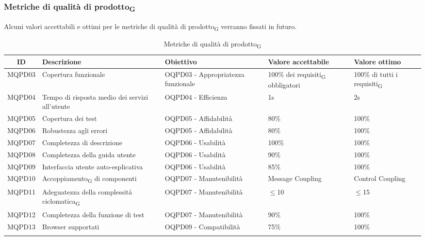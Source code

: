 \newpage
\subsubsection{Metriche di qualità di prodotto\textsubscript{G}}
Alcuni valori accettabili e ottimi per le metriche di qualità di prodotto\textsubscript{G} verranno fissati in futuro.
\begin{center}
	\setlength\extrarowheight{2pt}
	\begin{xltabular}{\textwidth}{|c|X|X|X|X|}
		\hline
		\textbf{ID} & \textbf{Descrizione} & \textbf{Obiettivo} & \textbf{Valore accettabile} & \textbf{Valore ottimo}\\
		\hline
		MQPD03 & Copertura funzionale & OQPD03 - Appropriatezza funzionale & 100\% dei requisiti\textsubscript{G} obbligatori & 100\% di tutti i requisiti\textsubscript{G}\\
		\hline
		MQPD04 & Tempo di risposta medio dei servizi all'utente & OQPD04 - Efficienza & 1s & 2s \\
		\hline
		MQPD05 & Copertura dei test & OQPD05 - Affidabilità & 80\% & 100\% \\
		\hline
		MQPD06 & Robustezza agli errori & OQPD05 - Affidabilità & 80\% & 100\% \\
		\hline
		MQPD07 & Completezza di descrizione & OQPD06 - Usabilità & 100\% &  100\% \\
		\hline
		MQPD08 & Completezza della guida utente & OQPD06 - Usabilità & 90\% &  100\% \\
		\hline
		MQPD09 & Interfaccia utente auto-esplicativa & OQPD06 - Usabilità & 85\% &  100\% \\
		\hline
		MQPD10 & Accoppiamento\textsubscript{G} di componenti & OQPD07 - Manutenibilità & Message Coupling & Control Coupling\\
		\hline
		MQPD11 & Adeguatezza della complessità ciclomatica\textsubscript{G} & OQPD07 - Manutenibilità & $\le$10 & $\le$15 \\
		\hline
		MQPD12 & Completezza della funzione di test & OQPD07 - Manutenibilità & 90\% & 100\% \\
		\hline
		MQPD13 & Browser supportati & OQPD09 - Compatibilità & 75\% & 100\% \\
		\hline
		\caption{Metriche di qualità di prodotto\textsubscript{G}}
	\end{xltabular}
\end{center}
